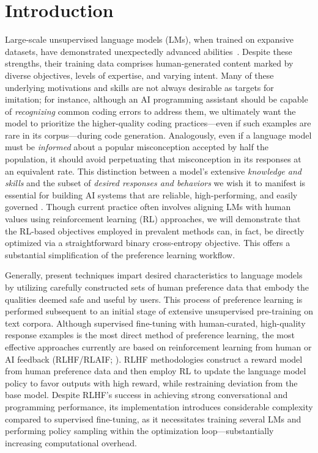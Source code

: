 \section{Introduction}
Large-scale unsupervised language models (LMs), when trained on expansive datasets, have demonstrated unexpectedly advanced abilities~\citep{chowdhery2022palm, brown2020language, touvron2023llama,bubeck2023sparks}. Despite these strengths, their training data comprises human-generated content marked by diverse objectives, levels of expertise, and varying intent. Many of these underlying motivations and skills are not always desirable as targets for imitation; for instance, although an AI programming assistant should be capable of \textit{recognizing} common coding errors to address them, we ultimately want the model to prioritize the higher-quality coding practices—even if such examples are rare in its corpus—during code generation. Analogously, even if a language model must be \textit{informed} about a popular misconception accepted by half the population, it should avoid perpetuating that misconception in its responses at an equivalent rate. This distinction between a model’s extensive \textit{knowledge and skills} and the subset of \emph{desired responses and behaviors} we wish it to manifest is essential for building AI systems that are reliable, high-performing, and easily governed \citep{ouyang2022training}. Though current practice often involves aligning LMs with human values using reinforcement learning (RL) approaches, we will demonstrate that the RL-based objectives employed in prevalent methods can, in fact, be directly optimized via a straightforward binary cross-entropy objective. This offers a substantial simplification of the preference learning workflow.

Generally, present techniques impart desired characteristics to language models by utilizing carefully constructed sets of human preference data that embody the qualities deemed safe and useful by users. This process of preference learning is performed subsequent to an initial stage of extensive unsupervised pre-training on text corpora. Although supervised fine-tuning with human-curated, high-quality response examples is the most direct method of preference learning, the most effective approaches currently are based on reinforcement learning from human or AI feedback (RLHF/RLAIF; \citep{christiano2017deep,bai2022constitutional}). RLHF methodologies construct a reward model from human preference data and then employ RL to update the language model policy to favor outputs with high reward, while restraining deviation from the base model. Despite RLHF’s success in achieving strong conversational and programming performance, its implementation introduces considerable complexity compared to supervised fine-tuning, as it necessitates training several LMs and performing policy sampling within the optimization loop—substantially increasing computational overhead.

